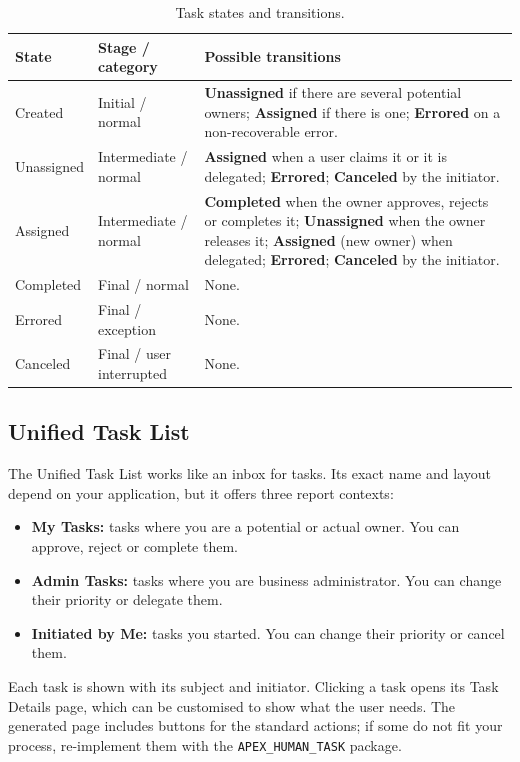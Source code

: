 \documentclass[11pt,a4paper]{article}
\begin{document}
\begin{table}[H]
\centering\small
\begin{tabularx}{\textwidth}{@{}llL@{}}
\toprule
\sffamily\bfseries State & \sffamily\bfseries Stage / category & \sffamily\bfseries Possible transitions \\
\midrule
Created & Initial / normal & \textbf{Unassigned} if there are several potential owners; \textbf{Assigned} if there is one; \textbf{Errored} on a non-recoverable error. \\
Unassigned & Intermediate / normal & \textbf{Assigned} when a user claims it or it is delegated; \textbf{Errored}; \textbf{Canceled} by the initiator. \\
Assigned & Intermediate / normal & \textbf{Completed} when the owner approves, rejects or completes it; \textbf{Unassigned} when the owner releases it; \textbf{Assigned} (new owner) when delegated; \textbf{Errored}; \textbf{Canceled} by the initiator. \\
Completed & Final / normal & None. \\
Errored & Final / exception & None. \\
Canceled & Final / user interrupted & None. \\
\bottomrule
\end{tabularx}
\caption{Task states and transitions.}
\label{tab:taskstates}
\end{table}

\subsection{Unified Task List}
The Unified Task List works like an inbox for tasks. Its exact name and layout depend on your application, but it offers three report contexts:
\begin{itemize}
\item \textbf{My Tasks:} tasks where you are a potential or actual owner. You can approve, reject or complete them.
\item \textbf{Admin Tasks:} tasks where you are business administrator. You can change their priority or delegate them.
\item \textbf{Initiated by Me:} tasks you started. You can change their priority or cancel them.
\end{itemize}
Each task is shown with its subject and initiator. Clicking a task opens its Task Details page, which can be customised to show what the user needs. The generated page includes buttons for the standard actions; if some do not fit your process, re-implement them with the \texttt{APEX\_HUMAN\_TASK} package.
\end{document}

